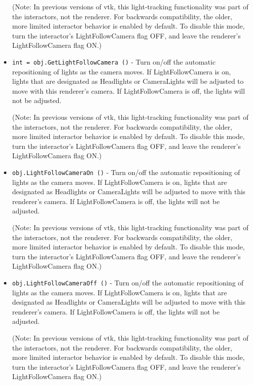 \begin{itemize}
 (Note: In previous versions of vtk, this light-tracking
 functionality was part of the interactors, not the renderer. For
 backwards compatibility, the older, more limited interactor
 behavior is enabled by default. To disable this mode, turn the
 interactor's LightFollowCamera flag OFF, and leave the renderer's
 LightFollowCamera flag ON.)

\item  \verb|int = obj.GetLightFollowCamera ()| -  Turn on/off the automatic repositioning of lights as the camera moves.
 If LightFollowCamera is on, lights that are designated as Headlights
 or CameraLights will be adjusted to move with this renderer's camera.
 If LightFollowCamera is off, the lights will not be adjusted.

 (Note: In previous versions of vtk, this light-tracking
 functionality was part of the interactors, not the renderer. For
 backwards compatibility, the older, more limited interactor
 behavior is enabled by default. To disable this mode, turn the
 interactor's LightFollowCamera flag OFF, and leave the renderer's
 LightFollowCamera flag ON.)

\item  \verb|obj.LightFollowCameraOn ()| -  Turn on/off the automatic repositioning of lights as the camera moves.
 If LightFollowCamera is on, lights that are designated as Headlights
 or CameraLights will be adjusted to move with this renderer's camera.
 If LightFollowCamera is off, the lights will not be adjusted.

 (Note: In previous versions of vtk, this light-tracking
 functionality was part of the interactors, not the renderer. For
 backwards compatibility, the older, more limited interactor
 behavior is enabled by default. To disable this mode, turn the
 interactor's LightFollowCamera flag OFF, and leave the renderer's
 LightFollowCamera flag ON.)

\item  \verb|obj.LightFollowCameraOff ()| -  Turn on/off the automatic repositioning of lights as the camera moves.
 If LightFollowCamera is on, lights that are designated as Headlights
 or CameraLights will be adjusted to move with this renderer's camera.
 If LightFollowCamera is off, the lights will not be adjusted.

 (Note: In previous versions of vtk, this light-tracking
 functionality was part of the interactors, not the renderer. For
 backwards compatibility, the older, more limited interactor
 behavior is enabled by default. To disable this mode, turn the
 interactor's LightFollowCamera flag OFF, and leave the renderer's
 LightFollowCamera flag ON.)


\end{itemize}
